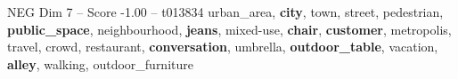 \begin{textsample}{NEG Dim 7 – Score -1.00 – t013834}  \label{ex:f7_neg_012}
urban\_area, \textbf{city}, town, street, pedestrian, \textbf{public\_space}, neighbourhood, \textbf{jeans}, mixed-use, \textbf{chair}, \textbf{customer}, metropolis, travel, crowd, restaurant, \textbf{conversation}, umbrella, \textbf{outdoor\_table}, vacation, \textbf{alley}, walking, outdoor\_furniture

\end{textsample}
